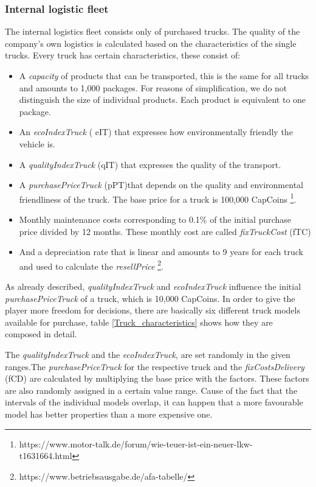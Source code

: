 \subsubsection{Internal logistic fleet}
The internal logistics fleet consists only of purchased trucks. The quality of the company's own logistics is calculated based on the characteristics of the single trucks. Every truck has certain characteristics, these consist of:
\begin{itemize}
    \item A \textit{capacity} of products that can be transported, this is the same for all trucks and amounts to 1,000 packages. For reasons of simplification, we do not distinguish the size of individual products.  Each product is equivalent to one package. 
    \item An \textit{ecoIndexTruck} ( \gls{eIT}) that expresses how environmentally friendly the vehicle is.
    \item A \textit{qualityIndexTruck} (\gls{qIT}) that expresses the quality of the transport.
    \item A \textit{purchasePriceTruck} (\gls{pPT})that depends on the quality and environmental friendliness of the truck. The base price for a truck is 100,000 CapCoins 
    \footnote{https://www.motor-talk.de/forum/wie-teuer-ist-ein-neuer-lkw-t1631664.html}.
    \item Monthly maintenance costs corresponding to 0.1\% of the initial purchase price divided by 12 months. These monthly cost are called \textit{fixTruckCost} (\gls{fTC})
    \item And a depreciation rate that is linear and amounts to 9 years for each truck and used to calculate the \textit{resellPrice}  \footnote{https://www.betriebsausgabe.de/afa-tabelle/}.
\end{itemize}

As already described, \textit{qualityIndexTruck} and \textit{ecoIndexTruck} influence the initial
\textit{purchasePriceTruck} of a truck, which is 10,000 CapCoins. In order to give the player more freedom for decisions, there are basically six different truck models available for purchase, table \ref{Truck_characteristics} shows how they are composed in detail.

The \textit{qualityIndexTruck} and the \textit{ecoIndexTruck}, are set randomly in the given ranges.The \textit{purchasePriceTruck} for the respective truck and the \textit{fixCostsDelivery} (\gls{fCD}) are calculated by multiplying the base price with the factors. These factors are also randomly assigned in a certain value range. Cause of the fact that the intervals of the individual models overlap, it can happen that a more favourable model has better properties than a more expensive one.

